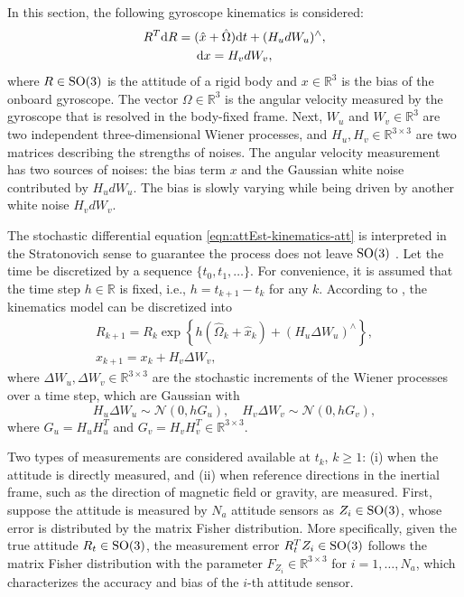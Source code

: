 In this section, the following gyroscope kinematics is considered:
\begin{gather}
	R^T\mathrm{d}{R} = (\hat{x}+\hat{\Omega})\mathrm{d}{t} + (H_udW_u)^\wedge, \label{eqn:attEst-kinematics-att} \\
	\mathrm{d}{x} = H_vdW_v \label{eqn:attEst-kinematics-bias},
\end{gather}
where $R\in\mathrm{SO}(3)$ is the attitude of a rigid body and $x\in\mathbb{R}^3$ is the bias of the onboard gyroscope.
The vector $\Omega\in\mathbb{R}^3$ is the angular velocity measured by the gyroscope that is resolved in the body-fixed frame.
Next, $W_u$ and $W_v\in\mathbb{R}^3$ are two independent three-dimensional Wiener processes, and $H_u, H_v \in \mathbb{R}^{3\times 3}$ are two matrices describing the strengths of noises.
The angular velocity measurement has two sources of noises: the bias term $x$ and the Gaussian white noise contributed by $H_u dW_u$.
The bias is slowly varying while being driven by another white noise $H_v dW_v$.

The stochastic differential equation \eqref{eqn:attEst-kinematics-att} is interpreted in the Stratonovich sense to guarantee the process does not leave $\mathrm{SO}(3)$ \cite{barrau2018stochastic,markley2006attitude}.
Let the time be discretized by a sequence $\{t_0,t_1,\ldots\}$. 
For convenience, it is assumed that the time step $h\in\mathbb{R}$ is fixed, i.e., $h= t_{k+1} - t_k$ for any $k$. 
According to \cite[Eqn. 14]{barrau2018stochastic}, the kinematics model can be discretized into
\begin{gather}
	R_{k+1} = R_k \exp\left\{ h (\hat{\Omega}_k+\hat{x}_k) + (H_u\Delta W_u)^\wedge \right\}, \label{eqn:attEst-kinematics-att-dist} \\
	x_{k+1} = x_k + H_v\Delta W_v,  \label{eqn:attEst-kinematics-bias-dist}
\end{gather}
where $\Delta W_u, \Delta W_v\in\mathbb{R}^{3\times 3}$ are the stochastic increments of the Wiener processes over a time step, which are Gaussian with
\begin{equation}\label{eqn:attEst-kinematics-DeltaW}
	H_u\Delta W_u \sim \mathcal{N}(0,hG_u), \quad H_v\Delta W_v \sim \mathcal{N}(0,hG_v),
\end{equation}
where $G_u = H_uH_u^T$ and $G_v = H_vH_v^T\in\mathbb{R}^{3\times 3}$.

Two types of measurements are considered available at $t_k$, $k\geq 1$: (i) when the attitude is directly measured, and (ii) when reference directions in the inertial frame, such as the direction of magnetic field or gravity, are measured.
First, suppose the attitude is measured by $N_a$ attitude sensors as $Z_i\in\mathrm{SO}(3)$, whose error is distributed by the matrix Fisher distribution.
More specifically, given the true attitude $R_t\in\mathrm{SO}(3)$, the measurement error $R_t^TZ_i\in\mathrm{SO}(3)$ follows the matrix Fisher distribution with the parameter $F_{Z_i}\in\mathbb{R}^{3\times 3}$ for $i=1,\ldots, N_a$, which characterizes the accuracy and bias of the $i$-th attitude sensor. 

